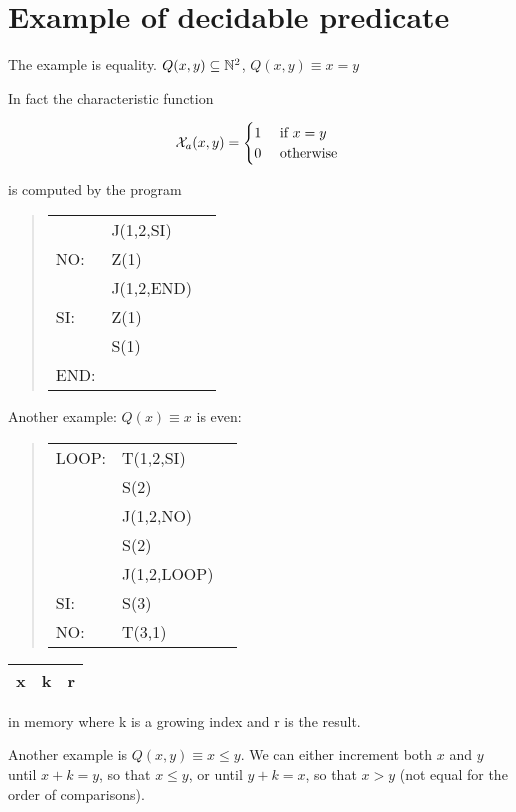 \section {Example of decidable predicate}

The example is equality. $ Q(x,y) \subseteq \mathbb{N}^2 $, $ Q(x,y) \equiv x = y $

In fact the characteristic function

\begin{equation*}
\mathcal{X}_a(x,y) = \begin{cases}
1 & $ if $ x = y  \\
0 & $ otherwise $
\end{cases}
\end{equation*}

is computed by the program

\begin{quote}
\begin{tabular}{lll}
& J(1,2,SI)  \\
NO:  & Z(1)       \\
& J(1,2,END) \\
SI:  & Z(1)       \\
& S(1)       \\
END: &
\end{tabular}
\end{quote}

Another example: $ Q(x) \equiv x $ is even:

\begin{quote}
\begin{tabular}{lll}
LOOP: & T(1,2,SI)   \\
& S(2)        \\
& J(1,2,NO)   \\
& S(2)        \\
& J(1,2,LOOP) \\
SI:   & S(3)        \\
NO:   & T(3,1)
\end{tabular}
\end{quote}

\begin{tabu}{|c|c|c|}
\hline
x & k & r \\
\hline
\end{tabu} in memory where k is a growing index and r is the result.

Another example is $Q(x,y) \equiv x \leq y$. We can either increment both $x$ and $y$ until $x+k=y$, so that $x\leq y$, or until $y+k=x$, so that $x>y$ (not equal for the order of comparisons).

